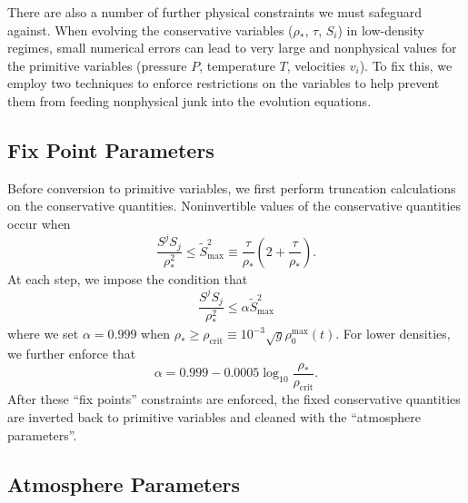 There are also a number of further physical constraints we must safeguard against.  When evolving the conservative variables ($\rho_*$, $\tau$, $S_i$) in low-density regimes, small numerical errors can lead to very large and nonphysical values for the primitive variables (pressure $P$, temperature $T$, velocities $v_i$).  To fix this, we employ two techniques to enforce restrictions on the variables to help prevent them from feeding nonphysical junk into the evolution equations.

\subsection*{Fix Point Parameters}

Before conversion to primitive variables, we first perform truncation calculations on the conservative quantities.  Noninvertible values of the conservative quantities occur when
\begin{equation}
\frac{S^j S_j}{\rho_*^2} \le \tilde{S}_\textrm{max}^2 \equiv \frac{\tau}{\rho_*}\left(2+\frac{\tau}{\rho_*}\right).
\end{equation}
At each step, we impose the condition that
\begin{equation}
\frac{S^j S_j}{\rho_*^2} \le \alpha \tilde{S}_\textrm{max}^2
\end{equation}
where we set $\alpha = 0.999$ when $\rho_* \ge \rho_\textrm{crit} \equiv  10^{-3} \sqrt{g} \rho_0^\textrm{max}(t)$.  For lower densities, we further enforce that 
\begin{equation}
\alpha = 0.999 - 0.0005 \log_{10}{\frac{\rho_*}{\rho_\textrm{crit}}}.
\end{equation}
After these ``fix points'' constraints are enforced, the fixed conservative quantities are inverted back to primitive variables and cleaned with the ``atmosphere parameters''.

\subsection*{Atmosphere Parameters}

